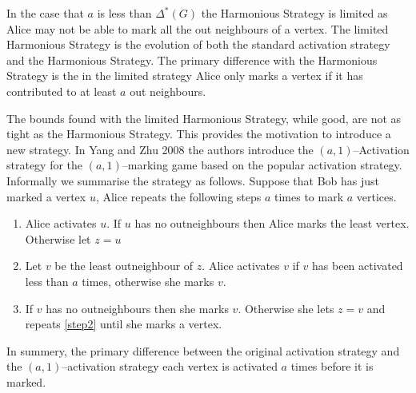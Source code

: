 In the case that $a$ is less than $\Delta^*(G)$ the Harmonious Strategy is limited as Alice may not be able to mark all the out neighbours of a vertex. The limited Harmonious Strategy is the evolution of both the standard activation strategy and the Harmonious Strategy. The primary difference with the Harmonious Strategy is the in the limited strategy Alice only marks a vertex if it has contributed to at least $a$ out neighbours.    

The bounds found with the limited Harmonious Strategy, while good, are not as tight as the Harmonious Strategy. This provides the motivation to introduce a new strategy. In Yang and Zhu 2008 \cite{yangZhu2008} the authors introduce the $(a,1)$--Activation strategy for the $(a,1)$--marking game based on the popular activation strategy. Informally we summarise the strategy as follows. Suppose that Bob has just marked a vertex $u$, Alice repeats the following steps $a$ times to mark $a$ vertices.
\begin{enumerate}
    \item Alice activates $u$. If $u$ has no outneighbours then Alice marks the least vertex. Otherwise let $z=u$
    
    \item Let $v$ be the least outneighbour of $z$. Alice activates $v$ if $v$ has been activated less than $a$ times, otherwise she marks $v$. \label{step2}
    
    \item If $v$ has no outneighbours then she marks $v$. Otherwise she lets $z=v$ and repeats \ref{step2} until she marks a vertex.     
\end{enumerate}
In summery, the primary difference between the original activation strategy and the $(a,1)$--activation strategy each vertex is activated $a$ times before it is marked.


